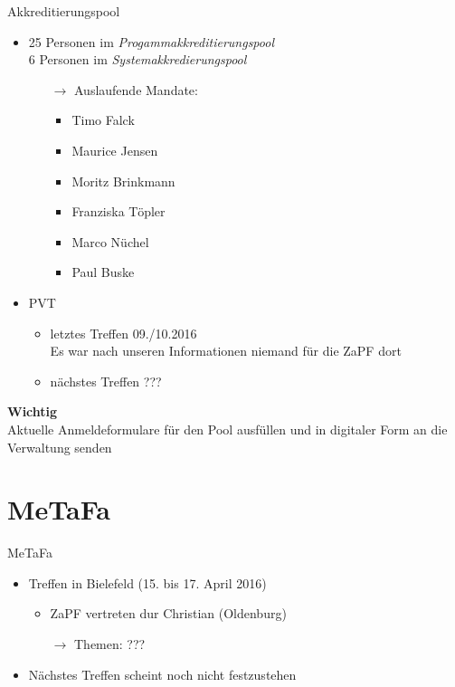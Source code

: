 \documentclass[compress,]{beamer}
\begin{document}
\begin{frame}{Akkreditierungspool}
	\begin{itemize}
		\item 25 Personen im \emph{Progammakkreditierungspool}\\
			6 Personen im \emph{Systemakkredierungspool}
			\begin{itemize}
				\item[$\rightarrow$] Auslaufende Mandate:
					\begin{itemize}
						\item Timo Falck
						\item Maurice Jensen
						\item Moritz Brinkmann
						\item Franziska Töpler
						\item Marco Nüchel
						\item Paul Buske
					\end{itemize}
			\end{itemize}
		\item PVT
			\begin{itemize}
				\item letztes Treffen 09./10.2016 \\
					Es war nach unseren Informationen niemand für die ZaPF dort
				\item nächstes Treffen ???
			\end{itemize}
	\end{itemize}
\end{frame}

\begin{frame}
	\begin{framed}
		\begin{center}
			{\Huge \textbf{Wichtig}}\\
			\vspace{0.5cm}
			{\Large Aktuelle Anmeldeformulare für den Pool ausfüllen und in digitaler Form an die Verwaltung senden}
		\end{center}
	\end{framed}
\end{frame}

\section{MeTaFa}

\begin{frame}{MeTaFa}
	\begin{itemize}
		\item Treffen in Bielefeld (15. bis 17. April 2016)
			\begin{itemize}
				\item ZaPF vertreten dur Christian (Oldenburg)
				\item[$\rightarrow$] Themen: ???
			\end{itemize}
		\item Nächstes Treffen scheint noch nicht festzustehen
	\end{itemize}
\end{frame}
\end{document}

